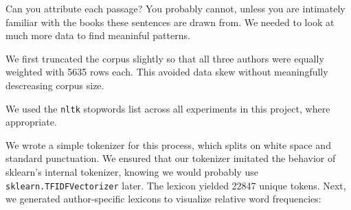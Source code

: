 \documentclass[12pt]{article}
\begin{document}
Can you attribute each passage? You probably cannot, unless you are intimately familiar with the books these sentences are drawn from. We needed to look at much more data to find meaninful patterns.

We first truncated the corpus slightly so that all three authors were equally weighted with 5635 rows each. This avoided data skew without meaningfully descreasing corpus size. 

We used the \texttt{nltk} stopwords list across all experiments in this project, where appropriate.

We wrote a simple tokenizer for this process, which splits on white space and standard punctuation. We ensured that our tokenizer imitated the behavior of sklearn's internal tokenizer, knowing we would probably use \texttt{sklearn.TFIDFVectorizer} later. The lexicon yielded 22847 unique tokens. Next, we generated author-specific lexicons to visualize relative word frequencies:
\end{document}
